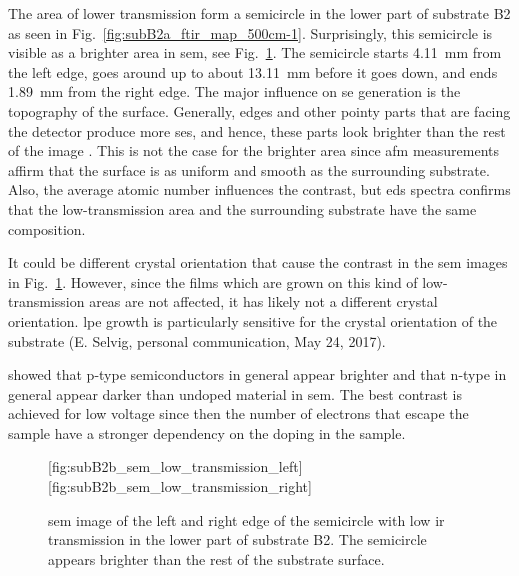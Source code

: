 The area of lower transmission form a semicircle in the lower part of substrate B2 as seen in Fig.~\ref{fig:subB2a_ftir_map_500cm-1}. Surprisingly, this semicircle is visible as a brighter area in \ac{sem}, see Fig.~\ref{fig:subB2b_sem_low_transmission}. The semicircle starts \SI{4.11}{\milli\metre} from the left edge, goes around up to about \SI{13.11}{\milli\metre} before it goes down, and ends \SI{1.89}{\milli\metre} from the right edge. The major influence on \ac{se} generation is the topography of the surface. Generally, edges and other pointy parts that are facing the detector produce more \acp{se}, and hence, these parts look brighter than the rest of the image \citep{goldstein2012scanning}. This is not the case for the brighter area since \ac{afm} measurements affirm that the surface is as uniform and smooth as the surrounding substrate. Also, the average atomic number influences the contrast, but \ac{eds} spectra confirms that the low-transmission area and the surrounding substrate have the same composition.

It could be different crystal orientation that cause the contrast in the \ac{sem} images in Fig.~\ref{fig:subB2b_sem_low_transmission}. However, since the films which are grown on this kind of low-transmission areas are not affected, it has likely not a different crystal orientation. \Ac{lpe} growth is particularly sensitive for the crystal orientation of the substrate (E. Selvig, personal communication, May 24, 2017).

\citet{sealy2000mechanism} showed that p-type semiconductors in general appear brighter and that n-type in general appear darker than undoped material in \ac{sem}. The best contrast is achieved for low voltage since then the number of electrons that escape the sample have a stronger dependency on the doping in the sample. 

\begin{figure}
    \centering
    [fig:subB2b_sem_low_transmission_left]
    \hfill
    [fig:subB2b_sem_low_transmission_right]
    \caption[\Ac{sem} image of the semicircle with low \ac{ir} transmission on substrate B2.]{\Ac{sem} image of the  left and  right edge of the semicircle with low \ac{ir} transmission in the lower part of substrate B2. The semicircle appears brighter than the rest of the substrate surface.}\label{fig:subB2b_sem_low_transmission}
\end{figure}


